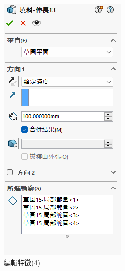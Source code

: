 \begin{figure}[h!]
\begin{minipage}[b]{0.35\textwidth}
        \includegraphics[width=\textwidth,height=0.35\textheight]{./../images/6-1-29} 
        \caption{編輯特徵(4)}
        \label{fig:feature1}
    \end{minipage}
\end{figure}

